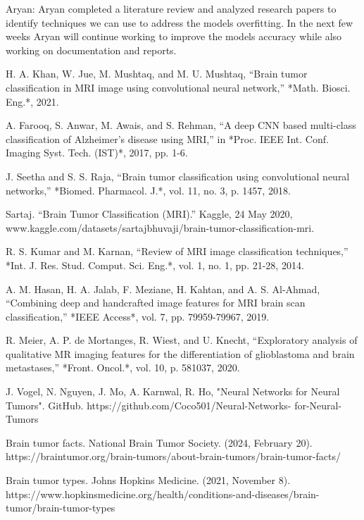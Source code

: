 \documentclass[conference]{IEEEtran}
\begin{document}
Aryan: Aryan completed a literature review and analyzed research papers to identify techniques we can use to address the models overfitting. In the next few weeks Aryan will continue working to improve the models accuracy while also working on documentation and reports. 

\begin{thebibliography}{00}

H. A. Khan, W. Jue, M. Mushtaq, and M. U. Mushtaq, “Brain tumor classification in MRI image using convolutional neural network,” *Math. Biosci. Eng.*, 2021. 

A. Farooq, S. Anwar, M. Awais, and S. Rehman, “A deep CNN based multi-class classification of Alzheimer's disease using MRI,” in *Proc. IEEE Int. Conf. Imaging Syst. Tech. (IST)*, 2017, pp. 1-6. 

J. Seetha and S. S. Raja, “Brain tumor classification using convolutional neural networks,” *Biomed. Pharmacol. J.*, vol. 11, no. 3, p. 1457, 2018.

Sartaj. “Brain Tumor Classification (MRI).” Kaggle, 24 May 2020, www.kaggle.com/datasets/sartajbhuvaji/brain-tumor-classification-mri. 

R. S. Kumar and M. Karnan, “Review of MRI image classification techniques,” *Int. J. Res. Stud. Comput. Sci. Eng.*, vol. 1, no. 1, pp. 21-28, 2014. 

A. M. Hasan, H. A. Jalab, F. Meziane, H. Kahtan, and A. S. Al-Ahmad, “Combining deep and handcrafted image features for MRI brain scan classification,” *IEEE Access*, vol. 7, pp. 79959-79967, 2019. 

R. Meier, A. P. de Mortanges, R. Wiest, and U. Knecht, “Exploratory analysis of qualitative MR imaging features for the differentiation of glioblastoma and brain metastases,” *Front. Oncol.*, vol. 10, p. 581037, 2020.

J. Vogel, N. Nguyen, J. Mo, A. Karnwal, R. Ho, "Neural Networks for Neural Tumors". GitHub. https://github.com/Coco501/Neural-Networks-
for-Neural-Tumors

Brain tumor facts. National Brain Tumor Society. (2024, February 20). https://braintumor.org/brain-tumors/about-brain-tumors/brain-tumor-facts/ 

Brain tumor types. Johns Hopkins Medicine. (2021, November 8). https://www.hopkinsmedicine.org/health/conditions-and-diseases/brain-tumor/brain-tumor-types 

\end{thebibliography}
\end{document}
